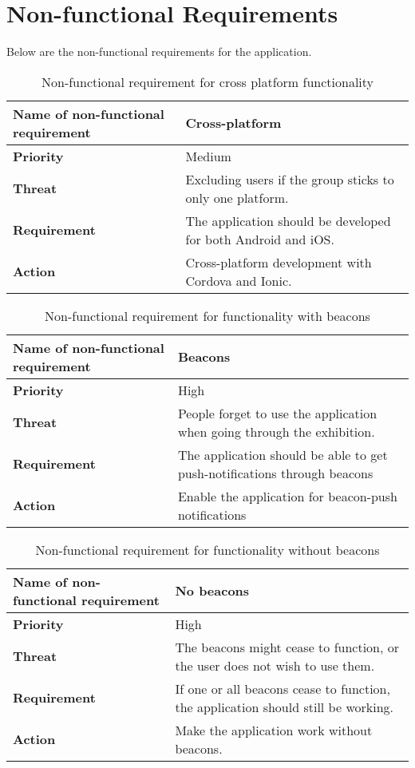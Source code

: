 \section{Non-functional Requirements}
Below are the non-functional requirements for the application.

\begin{table}[!htbp]
\caption{Non-functional requirement for cross platform functionality}
\begin{tabular}{ |p{7cm}|p{7cm}| }
\hline
\textbf {Name of non-functional requirement} & {Cross-platform} \\ \hline
\textbf {Priority} & {Medium} \\ \hline
\textbf {Threat} & {Excluding users if the group sticks to only one platform.} \\ \hline
\textbf {Requirement} & {The application should be developed for both Android and iOS.} \\ \hline
\textbf {Action} & {Cross-platform development with Cordova and Ionic.} \\ \hline
\end{tabular}
\end{table}

\begin{table}[!htbp]
\caption{Non-functional requirement for functionality with beacons}
\begin{tabular}{ |p{7cm}|p{7cm}| }
\hline
\textbf {Name of non-functional requirement} & {Beacons} \\ \hline
\textbf {Priority} & {High} \\ \hline
\textbf {Threat} & {People forget to use the application when going through the exhibition.} \\ \hline
\textbf {Requirement} & {The application should be able to get push-notifications through beacons} \\ \hline
\textbf {Action} & {Enable the application for beacon-push notifications} \\ \hline
\end{tabular}
\end{table}

\begin{table}[!h]
\caption{Non-functional requirement for functionality without beacons}
\begin{tabular}{ |p{7cm}|p{7cm}| }
\hline
\textbf {Name of non-functional requirement} & {No beacons} \\ \hline
\textbf {Priority} & {High} \\ \hline
\textbf {Threat} & {The beacons might cease to function, or the user does not wish to use them.} \\ \hline
\textbf {Requirement} & {If one or all beacons cease to function, the application should still be working.} \\ \hline
\textbf {Action} & {Make the application work without beacons.} \\ \hline
\end{tabular}
\end{table}


